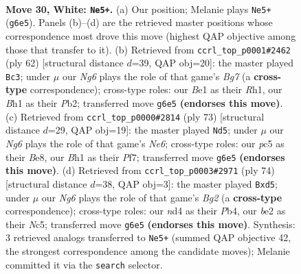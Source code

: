 \documentclass[11pt]{article}
\begin{document}
\clearpage

\begin{figure}[p]\centering
\begin{subfigure}{0.46\textwidth}\centering
\resizebox{\linewidth}{!}{%
\newchessgame
\chessboard[
  setfen={8/5k2/6N1/2pp1p2/3n4/1p6/1P2bP2/1K2B2B w - - 2 30},
  showmover=false,
  pgfstyle=straightmove, color=movearrow, markmove={g6-e5}
]}
\caption{}
\end{subfigure}\hfill
\begin{subfigure}{0.46\textwidth}\centering
\resizebox{\linewidth}{!}{%
\newchessgame
\chessboard[
  setfen={3r4/pp3kB1/2n5/6p1/P3p3/4P3/1P3PK1/7R w - - 1 32},
  showmover=false,
  pgfstyle=straightmove, color=movearrow, markmove={g7-c3}
]}
\caption{}
\end{subfigure}
\\[4pt]
\begin{subfigure}{0.46\textwidth}\centering
\resizebox{\linewidth}{!}{%
\newchessgame
\chessboard[
  setfen={4b3/5pp1/3kp3/7P/5P2/PN2nB2/1P1K4/8 b - - 2 37},
  showmover=false,
  pgfstyle=straightmove, color=movearrow, markmove={e3-d5}
]}
\caption{}
\end{subfigure}\hfill
\begin{subfigure}{0.46\textwidth}\centering
\resizebox{\linewidth}{!}{%
\newchessgame
\chessboard[
  setfen={1kb5/8/p2n4/1pNp4/1P6/P7/2P3B1/1K6 w - - 2 38},
  showmover=false,
  pgfstyle=straightmove, color=movearrow, markmove={g2-d5}
]}
\caption{}
\end{subfigure}
\caption{\textbf{Move 30, White: \texttt{Ne5+}.} (a) Our position; Melanie plays \texttt{Ne5+} (\texttt{g6e5}). Panels (b)--(d) are the retrieved master positions whose correspondence most drove this move (highest QAP objective among those that transfer to it). (b) Retrieved from \texttt{ccrl\_top\_p0001\#2462} (ply 62) [structural distance $d$=39, QAP obj=20]: the master played \texttt{Bc3}; under $\mu$ our \emph{Ng6} plays the role of that game's \emph{Bg7} (a \textbf{cross-type} correspondence); cross-type roles: our \emph{B}e1 as their \emph{R}h1, our \emph{B}h1 as their \emph{P}b2; transferred move \texttt{g6e5} \textbf{(endorses this move)}. (c) Retrieved from \texttt{ccrl\_top\_p0000\#2814} (ply 73) [structural distance $d$=29, QAP obj=19]: the master played \texttt{Nd5}; under $\mu$ our \emph{Ng6} plays the role of that game's \emph{Ne6}; cross-type roles: our \emph{p}c5 as their \emph{B}e8, our \emph{B}h1 as their \emph{P}f7; transferred move \texttt{g6e5} \textbf{(endorses this move)}. (d) Retrieved from \texttt{ccrl\_top\_p0003\#2971} (ply 74) [structural distance $d$=38, QAP obj=3]: the master played \texttt{Bxd5}; under $\mu$ our \emph{Ng6} plays the role of that game's \emph{Bg2} (a \textbf{cross-type} correspondence); cross-type roles: our \emph{n}d4 as their \emph{P}b4, our \emph{b}e2 as their \emph{N}c5; transferred move \texttt{g6e5} \textbf{(endorses this move)}. Synthesis: 3 retrieved analogs transferred to \texttt{Ne5+} (summed QAP objective 42, the strongest correspondence among the candidate moves); Melanie committed it via the \texttt{search} selector.}
\label{fig:thought-m58}
\end{figure}
\end{document}
